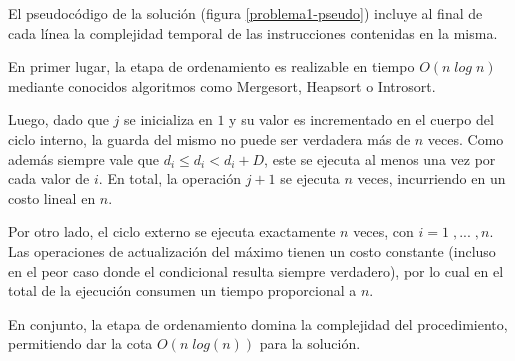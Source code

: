 El pseudocódigo de la solución (figura \ref{problema1-pseudo}) incluye al final de cada línea la complejidad temporal de las instrucciones contenidas en la misma.

En primer lugar, la etapa de ordenamiento es realizable en tiempo $O(n\;log\;n)$ mediante conocidos algoritmos como Mergesort, Heapsort o Introsort.

Luego, dado que $j$ se inicializa en $1$ y su valor es incrementado en el cuerpo del ciclo interno, la guarda del mismo no puede ser verdadera más de $n$ veces. Como además siempre vale que $d_i \leq d_i < d_i + D$, este se ejecuta al menos una vez por cada valor de $i$. En total, la operación $j + 1$ se ejecuta $n$ veces, incurriendo en un costo lineal en $n$.

Por otro lado, el ciclo externo se ejecuta exactamente $n$ veces, con $i = 1\;, ...\;, n$. Las operaciones de actualización del máximo tienen un costo constante (incluso en el peor caso donde el condicional resulta siempre verdadero), por lo cual en el total de la ejecución consumen un tiempo proporcional a $n$.

En conjunto, la etapa de ordenamiento domina la complejidad del procedimiento, permitiendo dar la cota $O(n\;log(n))$ para la solución.


